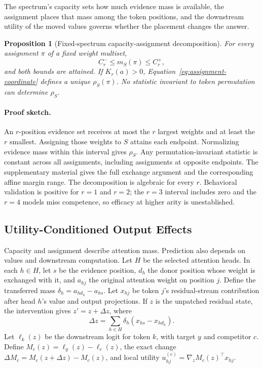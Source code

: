 \documentclass{article}
\newtheorem{proposition}{Proposition}
\begin{document}
The spectrum's capacity sets how much evidence mass is available, the assignment places that mass among the
token positions, and the downstream utility of the moved values governs whether the placement changes the
answer.

\begin{proposition}[Fixed-spectrum capacity-assignment decomposition]
For every assignment $\pi$ of a fixed weight multiset,
\begin{equation}
 C_r^-\le m_S(\pi)\le C_r^+,
\end{equation}
and both bounds are attained. If $K_r(a)>0$, Equation~\ref{eq:assignment-coordinate} defines a unique
$\rho_S(\pi)$. No statistic invariant to token permutation can determine $\rho_S$.
\label{prop:capacity}
\end{proposition}

\paragraph{Proof sketch.}
An $r$-position evidence set receives at most the $r$ largest weights and at least the $r$ smallest. Assigning
those weights to $S$ attains each endpoint. Normalizing evidence mass within this interval gives $\rho_S$.
Any permutation-invariant statistic is constant across all assignments, including assignments at opposite
endpoints. The supplementary material gives the full exchange argument and the corresponding affine margin range.
The decomposition is algebraic for every $r$. Behavioral validation is positive for $r=1$ and $r=2$; the
$r=3$ interval includes zero and the $r=4$ models miss competence, so efficacy at higher arity is unestablished.

\subsection{Utility-Conditioned Output Effects}

Capacity and assignment describe attention mass. Prediction also depends on values and downstream
computation. Let $H$ be the selected attention heads. In each $h\in H$, let $s$ be the evidence position,
$d_h$ the donor position whose weight is exchanged with it, and $a_{hj}$ the original attention weight on
position $j$. Define the transferred mass $\delta_h=a_{h d_h}-a_{h s}$. Let $x_{hj}$ be token $j$'s
residual-stream contribution after head $h$'s value and output projections. If $z$ is the unpatched residual
state, the intervention gives $z'=z+\Delta z$, where
\begin{equation}
 \Delta z=\sum_{h\in H}\delta_h(x_{hs}-x_{hd_h}).
\label{eq:residual-change}
\end{equation}
Let $\ell_k(z)$ be the downstream logit for token $k$, with target $y$ and competitor $c$. Define
$M_c(z)=\ell_y(z)-\ell_c(z)$, the exact change $\Delta M_c=M_c(z+\Delta z)-M_c(z)$, and local utility
$u_{hj}^{(c)}=\nabla_z M_c(z)^\top x_{hj}$.
\end{document}
